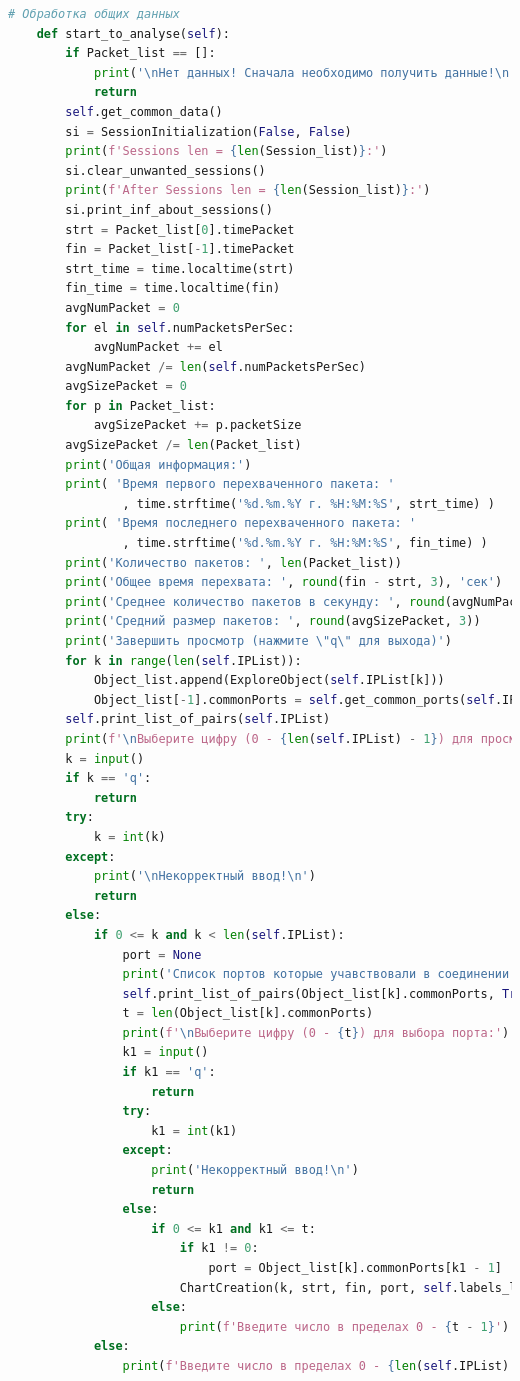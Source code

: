 \documentclass[spec, och, diploma]{SCWorks}
\begin{document}
\begin{lstlisting}[language=Python]
    # Обработка общих данных
    def start_to_analyse(self):
        if Packet_list == []:
            print('\nНет данных! Сначала необходимо получить данные!\n')
            return
        self.get_common_data()
        si = SessionInitialization(False, False)
        print(f'Sessions len = {len(Session_list)}:')
        si.clear_unwanted_sessions()
        print(f'After Sessions len = {len(Session_list)}:')
        si.print_inf_about_sessions()
        strt = Packet_list[0].timePacket
        fin = Packet_list[-1].timePacket
        strt_time = time.localtime(strt)
        fin_time = time.localtime(fin)
        avgNumPacket = 0
        for el in self.numPacketsPerSec:
            avgNumPacket += el
        avgNumPacket /= len(self.numPacketsPerSec)
        avgSizePacket = 0
        for p in Packet_list:
            avgSizePacket += p.packetSize
        avgSizePacket /= len(Packet_list)
        print('Общая информация:')
        print( 'Время первого перехваченного пакета: '
                , time.strftime('%d.%m.%Y г. %H:%M:%S', strt_time) )
        print( 'Время последнего перехваченного пакета: '
                , time.strftime('%d.%m.%Y г. %H:%M:%S', fin_time) )
        print('Количество пакетов: ', len(Packet_list))
        print('Общее время перехвата: ', round(fin - strt, 3), 'сек')
        print('Среднее количество пакетов в секунду: ', round(avgNumPacket, 3))
        print('Средний размер пакетов: ', round(avgSizePacket, 3))
        print('Завершить просмотр (нажмите \"q\" для выхода)')
        for k in range(len(self.IPList)):
            Object_list.append(ExploreObject(self.IPList[k]))
            Object_list[-1].commonPorts = self.get_common_ports(self.IPList[k])
        self.print_list_of_pairs(self.IPList)
        print(f'\nВыберите цифру (0 - {len(self.IPList) - 1}) для просмотра IP-адреса:')
        k = input()
        if k == 'q':
            return
        try:
            k = int(k)
        except:
            print('\nНекорректный ввод!\n')
            return
        else:
            if 0 <= k and k < len(self.IPList):
                port = None
                print('Список портов которые учавствовали в соединении с данным IP-адресом')
                self.print_list_of_pairs(Object_list[k].commonPorts, True)
                t = len(Object_list[k].commonPorts)
                print(f'\nВыберите цифру (0 - {t}) для выбора порта:')
                k1 = input()
                if k1 == 'q':
                    return
                try:
                    k1 = int(k1)
                except:
                    print('Некорректный ввод!\n')
                    return
                else:
                    if 0 <= k1 and k1 <= t:
                        if k1 != 0:
                            port = Object_list[k].commonPorts[k1 - 1]
                        ChartCreation(k, strt, fin, port, self.labels_list).start_to_plot()
                    else:
                        print(f'Введите число в пределах 0 - {t - 1}')
            else:
                print(f'Введите число в пределах 0 - {len(self.IPList) - 1}')
    \end{lstlisting}
\end{document}
